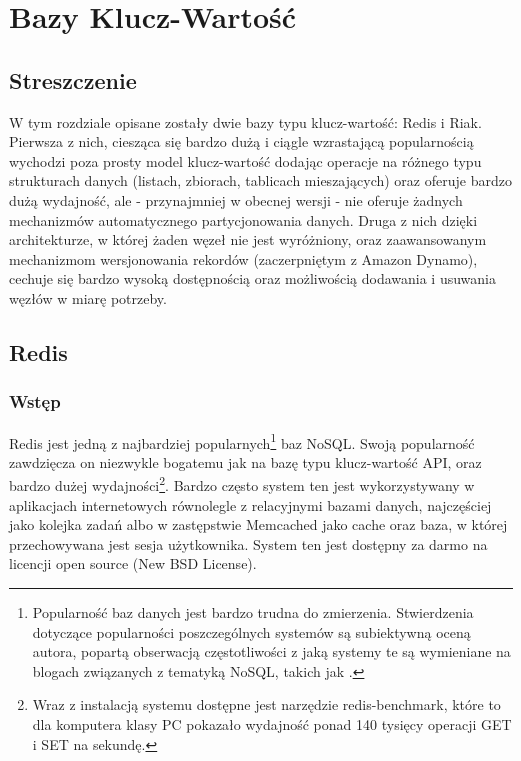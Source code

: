 \chapter{Bazy Klucz-Wartość}

\section*{Streszczenie}
W tym rozdziale opisane zostały dwie bazy typu klucz-wartość: Redis i Riak.
Pierwsza z nich, ciesząca się bardzo dużą i ciągle wzrastającą popularnością wychodzi poza prosty model klucz-wartość dodając operacje na różnego typu strukturach danych (listach, zbiorach, tablicach mieszających) oraz oferuje bardzo dużą wydajność, ale - przynajmniej w obecnej wersji - nie oferuje żadnych mechanizmów automatycznego partycjonowania danych.
Druga z nich dzięki architekturze, w której żaden węzeł nie jest wyróżniony, oraz zaawansowanym mechanizmom wersjonowania rekordów (zaczerpniętym z Amazon Dynamo), cechuje się bardzo wysoką dostępnością oraz możliwością dodawania i usuwania węzłów w miarę potrzeby.

\section{Redis}
\label{sec:redis}

\subsection*{Wstęp} 

Redis jest jedną z najbardziej popularnych\footnote{Popularność baz danych jest bardzo trudna do zmierzenia. Stwierdzenia dotyczące popularności poszczególnych systemów są subiektywną oceną autora, popartą obserwacją częstotliwości z jaką systemy te są wymieniane na blogach związanych z tematyką NoSQL, takich jak \cite{mynosql}.} baz NoSQL.
Swoją popularność zawdzięcza on niezwykle bogatemu jak na bazę typu klucz-wartość API, oraz bardzo dużej wydajności\footnote{Wraz z instalacją systemu dostępne jest narzędzie redis-benchmark, które to dla komputera klasy PC pokazało wydajność ponad 140 tysięcy operacji GET i SET na sekundę.}.
Bardzo często system ten jest wykorzystywany w aplikacjach internetowych równolegle z relacyjnymi bazami danych, najczęściej jako kolejka zadań albo w zastępstwie Memcached jako cache oraz baza, w której przechowywana jest sesja użytkownika.
System ten jest dostępny za darmo na licencji open source (New BSD License).

